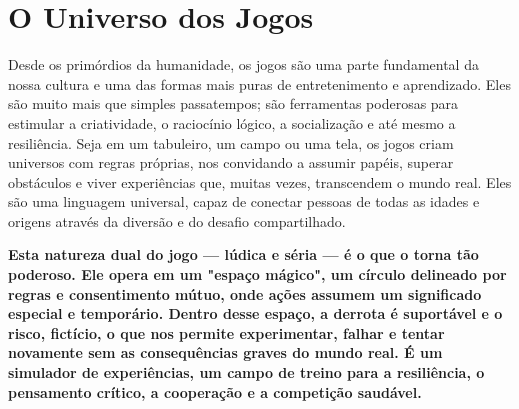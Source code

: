 \documentclass[a4paper]{article}
\begin{document}
\maketitle{}
\section{O Universo dos Jogos}
Desde os primórdios da humanidade, os jogos são uma parte fundamental da nossa cultura e uma das formas mais puras de entretenimento e aprendizado. Eles são muito mais que simples passatempos; são ferramentas poderosas para estimular a criatividade, o raciocínio lógico, a socialização e até mesmo a resiliência. Seja em um tabuleiro, um campo ou uma tela, os jogos criam universos com regras próprias, nos convidando a assumir papéis, superar obstáculos e viver experiências que, muitas vezes, transcendem o mundo real. Eles são uma linguagem universal, capaz de conectar pessoas de todas as idades e origens através da diversão e do desafio compartilhado.

\textbf{
Esta natureza dual do jogo — lúdica e séria — é o que o torna tão poderoso. Ele opera em um "espaço mágico", um círculo delineado por regras e consentimento mútuo, onde ações assumem um significado especial e temporário. Dentro desse espaço, a derrota é suportável e o risco, fictício, o que nos permite experimentar, falhar e tentar novamente sem as consequências graves do mundo real. É um simulador de experiências, um campo de treino para a resiliência, o pensamento crítico, a cooperação e a competição saudável.}
\end{document}

